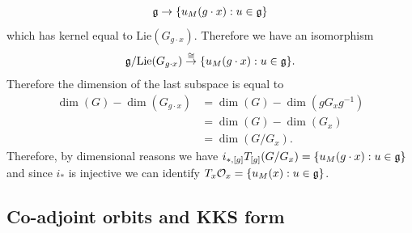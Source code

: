 \begin{itemize}
        \begin{equation}
            \mathfrak{g}\to \{u_M(g\cdot x):u\in\mathfrak{g}\}
        \end{equation}
        which has kernel equal to $\text{Lie}(G_{g\cdot x})$. Therefore we have an isomorphism
        \begin{equation}
            \mathfrak{g}/\text{Lie}(G_{g\cdot x})\overset{\cong}{\to}\{u_M(g\cdot x):u\in\mathfrak{g}\}.
        \end{equation}
        Therefore the dimension of the last subspace is equal to 
        \begin{equation}
            \begin{split}
                \dim(G)-\dim(G_{g\cdot x})&=\dim(G)-\dim(gG_xg^{-1})\\
                &=\dim(G)-\dim(G_x)\\
                &=\dim(G/G_x).
            \end{split}
        \end{equation}
        Therefore, by dimensional reasons we have $i_{*,[g]}T_{[g]}(G/G_x)=\{u_M(g\cdot x):u\in\mathfrak{g}\}$ and since 
        $i_*$ is injective we can identify $T_x{\mathcal{O}_x}=\{u_M(x):u\in\mathfrak{g}\}$.
\end{itemize}

\subsection{Co-adjoint orbits and KKS form}


